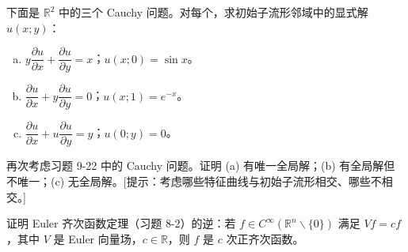 \documentclass[../../main.tex]{subfiles}
\begin{document}
\begin{exercise}\label{exercise:ch09-22}
下面是 $\mathbb{R}^2$ 中的三个 Cauchy 问题。对每个，求初始子流形邻域中的显式解 $u(x;y)$：
\begin{enumerate}[(a)]
\item $y\dfrac{\partial u}{\partial x}+\dfrac{\partial u}{\partial y}=x$；$u(x;0)=\sin x$。
\item $\dfrac{\partial u}{\partial x}+y\dfrac{\partial u}{\partial y}=0$；$u(x;1)=e^{-x}$。
\item $\dfrac{\partial u}{\partial x}+u\dfrac{\partial u}{\partial y}=y$；$u(0;y)=0$。
\end{enumerate}
\end{exercise}

\begin{exercise}\label{exercise:ch09-23}
再次考虑习题 9-22 中的 Cauchy 问题。证明 (a) 有唯一全局解；(b) 有全局解但不唯一；(c) 无全局解。[提示：考虑哪些特征曲线与初始子流形相交、哪些不相交。]
\end{exercise}

\begin{exercise}\label{exercise:ch09-24}
证明 Euler 齐次函数定理（习题 8-2）的逆：若 $f\in C^\infty(\mathbb{R}^n\smallsetminus\{0\})$ 满足 $Vf=cf$，其中 $V$ 是 Euler 向量场，$c\in\mathbb{R}$，则 $f$ 是 $c$ 次正齐次函数。
\end{exercise}
\end{document}
